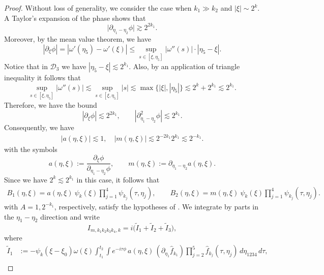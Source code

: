 \documentclass[reqno,english,11pt]{amsart}
\theoremstyle{definition}
\numberwithin{equation}{section}
\begin{document}
\begin{proof}
Without loss of generality, we consider the case when $k_1\gg k_2$ and $|\xi|\sim 2^{k}$. A Taylor's expansion of the phase shows that
\begin{equation}\label{eq:deg_case_3_freq_derivative_bound}
    \big|\partial_{\eta_1-\eta_2}\phi\big| \gtrsim 2^{2k_1}.
\end{equation}
Moreover, by the mean value theorem, we have 
$$\left|\partial_\xi\phi\right|=\left|\omega'(\eta_5)-\omega'(\xi)\right|\leq \sup_{s\in [\xi,\eta_5]}|\omega''(s)|\cdot\left|\eta_5-\xi\right|.$$
Notice that in $\mathcal{D}_3$ we have $\left|\eta_5-\xi\right|\lesssim 2^{k_1}$. Also, by an application of triangle inequality it follows that
$$\sup_{s\in [\xi,\eta_5]}|\omega''(s)|\lesssim \sup_{s\in [\xi,\eta_5]}|s|\lesssim \max\{|\xi|,|\eta_5|\}\lesssim 2^{k}+2^{k_1}\lesssim 2^{k_1}.$$
Therefore, we have the bound
\begin{equation}\label{eq:deg_case_3_via_freq_bounds}
    |\partial_\xi \phi| \lesssim 2^{2k_1},
    \qquad
    |\partial_{\eta_1-\eta_2}^2\phi| \lesssim 2^{k_1}.
\end{equation}
Consequently, we have 
\begin{align}
\label{eqn:case3_symbol_bounds}
 \left|a(\eta,\xi)\right| \lesssim 1,
 \quad  \left|m(\eta,\xi) \right| \lesssim 2^{-2k_{1}}2^{k_1}\lesssim 2^{-k_1}.
\end{align}
with the symbols
$$a(\eta,\xi):=\frac{\partial_\xi \phi}{\partial_{\eta_1-\eta_2}\phi},\qquad m(\eta,\xi):=\partial_{\eta_1-\eta_2}a(\eta,\xi).$$
Since we have $2^k\lesssim 2^{k_1}$ in this case, it follows that
\begin{align*}
B_1(\eta,\xi) =  a(\eta,\xi)\ \psi_{k}\left(\xi\right) \prod^{4}_{j=1}  \psi_{k_j}\left(\tau,\eta_j\right),\qquad
B_2(\eta,\xi) =  m(\eta,\xi)\ \psi_{k}\left(\xi\right) \prod^{4}_{j=1}  \psi_{k_j}\left(\tau,\eta_j\right).
\end{align*}
with $A=1, 2^{-k_1}$, respectively, satisfy the hypotheses of \cite[Lemma~B.3]{Morgan}. We integrate by parts in the $\eta_1-\eta_2$ direction and write
\begin{equation}\label{eq:deg_case_3_IBP}
I_{m,k_1k_2k_3k_4,k}
=
i\bigl(\tilde I_1+\tilde I_2+\tilde I_3\bigr),
\end{equation}
where
\begin{align*}
\tilde I_1
&:=-\psi_k(\xi-\xi_0)\omega(\xi)\int_{t_1}^{t_2}\!\!\int e^{-i\tau\phi}\,a(\eta,\xi)\,(\partial_{\eta_1}\hat f_{k_1})\prod^5_{j=2}\hat f_{k_j}(\tau,\eta_j) \,d\eta_{1234}\,d\tau,\\

\end{align*}
\end{proof}
\end{document}

